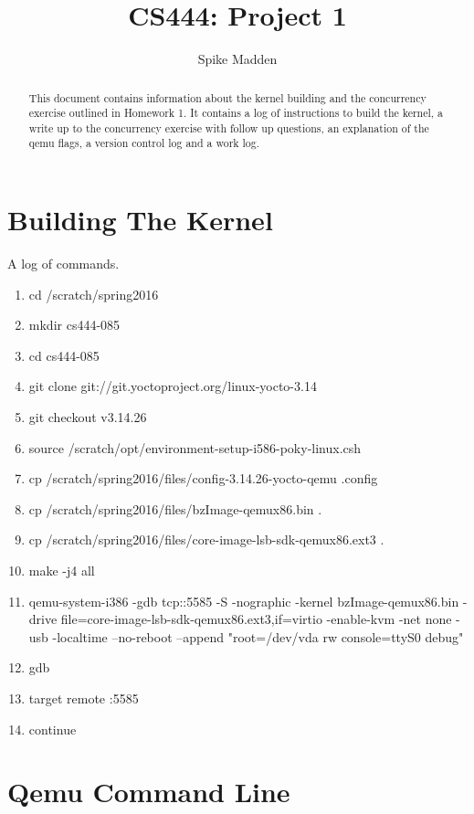 \documentclass[letterpaper,
10pt, titlepage, draftclsnofoot, onecolumn]{IEEEtran}
\title{CS444: Project 1}
\author{Spike Madden}
\begin{document}
\begin{titlingpage}
	\maketitle
	\begin{abstract}
		This document contains information about the kernel building and the concurrency exercise outlined in Homework 1. It contains a log of instructions to build the kernel, a write up to the concurrency exercise with follow up questions, an explanation of the qemu flags, a version control log and a work log.

	\end{abstract}
\end{titlingpage}

\section*{Building The Kernel}

A log of commands.

\begin{enumerate}
\item cd /scratch/spring2016
\item mkdir cs444-085
\item cd cs444-085
\item git clone git://git.yoctoproject.org/linux-yocto-3.14
\item git checkout v3.14.26
\item source /scratch/opt/environment-setup-i586-poky-linux.csh
\item cp /scratch/spring2016/files/config-3.14.26-yocto-qemu .config
\item cp /scratch/spring2016/files/bzImage-qemux86.bin .
\item cp /scratch/spring2016/files/core-image-lsb-sdk-qemux86.ext3 .
\item make -j4 all
\item qemu-system-i386 -gdb tcp::5585 -S -nographic -kernel bzImage-qemux86.bin -drive file=core-image-lsb-sdk-qemux86.ext3,if=virtio -enable-kvm -net none -usb -localtime --no-reboot --append "root=/dev/vda rw console=ttyS0 debug"
\item gdb
\item target remote :5585
\item continue
\end{enumerate}

\section*{Qemu Command Line}
\end{document}
